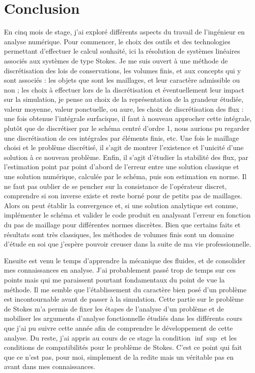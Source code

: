 
\chapter*{Conclusion}

\noindent En cinq mois de stage, j'ai exploré différents aspects du travail de l'ingénieur en analyse numérique. Pour commencer, le choix des outils et des technologies permettant d'effectuer le calcul souhaité, ici la résolution de systèmes linéaires associés aux systèmes de type Stokes. Je me suis ouvert à une méthode de discrétisation des lois de conservations, les volumes finis, et aux concepts qui y sont associés : les objets que sont les maillages, et leur caractère admissible ou non ; les choix à effectuer lors de la discrétisation et éventuellement leur impact sur la simulation, je pense au choix de la représentation de la grandeur étudiée, valeur moyenne, valeur ponctuelle, ou aure, les choix de discrétisation des flux : une fois obtenue l'intégrale surfacique, il faut à nouveau approcher cette intégrale, plutôt que de discrétiser par le schéma centré d'ordre 1, nous aurions pu regarder une discrétisation de ces intégrales par éléments finis, etc. Une fois le maillage choisi et le problème discrétisé, il s'agit de montrer l'existence et l'unicité d'une solution à ce nouveau problème. Enfin, il s'agit d'étudier la stabilité des flux, par l'estimation point par point d'abord de l'erreur entre une solution classique et une solution numérique, calculée par le schéma, puis son estimation en norme. Il ne faut pas oublier de se pencher sur la consistance de l'opérateur discret, comprendre si son inverse existe et reste borné pour de petits pas de maillages. Alors on peut établir la convergence et, si une solution analytique est connue, implémenter le schéma et valider le code produit en analysant l'erreur en fonction du pas de maillage pour différentes normes discrètes. Bien que certains faits et résultats sont très classiques, les méthodes de volumes finis sont un domaine d'étude en soi que j'espère pouvoir creuser dans la suite de ma vie professionnelle. 

Ensuite est venu le temps d'apprendre la mécanique des fluides, et de consolider mes connaissances en analyse. J'ai probablement passé trop de temps sur ces points mais qui me paraissent pourtant fondamentaux du point de vue la méthode. Il me semble que l'établissement du caractère bien posé d'un problème est incontournable avant de passer à la simulation. Cette partie sur le problème de Stokes m'a permis de fixer les étapes de l'analyse d'un problème et de mobiliser les arguments d'analyse fonctionnelle étudiés dans les différents cours que j'ai pu suivre cette année afin de comprendre le développement de cette analyse. Du reste, j'ai appris au cours de ce stage la condition $\inf \sup$ et les conditions de compatibilités pour le problème de Stokes. C'est ce point qui fait que ce n'est pas, pour moi, simplement de la redite mais un véritable pas en avant dans mes connaissances.

